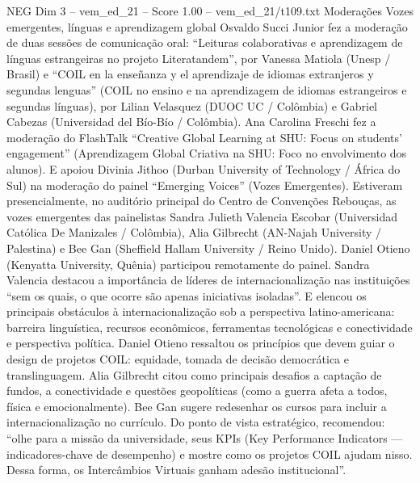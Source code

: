 \begin{textsample}{NEG Dim 3 – vem\_ed\_21 – Score 1.00 – vem\_ed\_21/t109.txt}  \label{ex:f3_neg_039}
Moderações Vozes emergentes, línguas e aprendizagem global Osvaldo Succi Junior fez a moderação de duas sessões de comunicação oral: “Leituras colaborativas e aprendizagem de línguas estrangeiras no projeto Literatandem”, por Vanessa Matiola (Unesp / Brasil) e “COIL en la enseñanza y el aprendizaje de idiomas extranjeros y segundas lenguas” (COIL no ensino e na aprendizagem de idiomas estrangeiros e segundas línguas), por Lilian Velasquez (DUOC UC / Colômbia) e Gabriel Cabezas (Universidad del Bío-Bío / Colômbia).
Ana Carolina Freschi fez a moderação do FlashTalk “Creative Global Learning at SHU: Focus on students’ engagement” (Aprendizagem Global Criativa na SHU: Foco no envolvimento dos alunos).
E apoiou Divinia Jithoo (Durban University of Technology / África do Sul) na moderação do painel “Emerging Voices” (Vozes Emergentes).
Estiveram presencialmente, no auditório principal do Centro de Convenções Rebouças, as vozes emergentes das painelistas Sandra Julieth Valencia Escobar (Universidad Católica De Manizales / Colômbia), Alia Gilbrecht (AN-Najah University / Palestina) e Bee Gan (Sheffield Hallam University / Reino Unido).
Daniel Otieno (Kenyatta University, Quênia) participou remotamente do painel.
Sandra Valencia destacou a importância de líderes de internacionalização nas instituições “sem os quais, o que ocorre são apenas iniciativas isoladas”.
E elencou os principais obstáculos à internacionalização sob a perspectiva latino-americana: barreira linguística, recursos econômicos, ferramentas tecnológicas e conectividade e perspectiva política.
Daniel Otieno ressaltou os princípios que devem guiar o design de projetos COIL: equidade, tomada de decisão democrática e translinguagem.
Alia Gilbrecht citou como principais desafios a captação de fundos, a conectividade e questões geopolíticas (como a guerra afeta a todos, física e emocionalmente).
Bee Gan sugere redesenhar os cursos para incluir a internacionalização no currículo.
Do ponto de vista estratégico, recomendou: “olhe para a missão da universidade, seus KPIs (Key Performance Indicators — indicadores-chave de desempenho) e mostre como os projetos COIL ajudam nisso.
Dessa forma, os Intercâmbios Virtuais ganham adesão institucional”.

\end{textsample}

